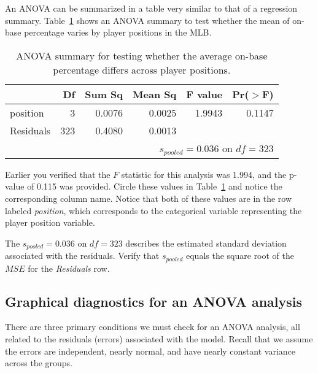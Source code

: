 An ANOVA can be summarized in a table very similar to that of a regression summary. Table~\ref{anovaSummaryTableForOBPAgainstPosition} shows an ANOVA summary to test whether the mean of on-base percentage varies by player positions in the MLB.

\begin{table}[ht]
\centering
\begin{tabular}{lrrrrr}
  \hline
 & Df & Sum Sq & Mean Sq & F value & Pr($>$F) \\ 
  \hline
position & 3 & 0.0076 & 0.0025 & 1.9943 & 0.1147 \\ 
  Residuals & 323 & 0.4080 & 0.0013 &  &  \\    \hline
\multicolumn{6}{r}{$s_{pooled} = 0.036$ on $df=323$}
\end{tabular}
\caption{ANOVA summary for testing whether the average on-base percentage differs across player positions.}
\label{anovaSummaryTableForOBPAgainstPosition}
\end{table}

\begin{exercise}
Earlier you verified that the $F$ statistic for this analysis was 1.994, and the p-value of 0.115 was provided. Circle these values in Table~\ref{anovaSummaryTableForOBPAgainstPosition} and notice the corresponding column name. Notice that both of these values are in the row labeled \emph{position}, which corresponds to the categorical variable representing the player position variable.
\end{exercise}

\begin{exercise}
The $s_{pooled}=0.036$ on $df=323$ describes the estimated standard deviation associated with the residuals. Verify that $s_{pooled}$ equals the square root of the $MSE$ for the \emph{Residuals} row.
\end{exercise}


\subsection{Graphical diagnostics for an ANOVA analysis}

There are three primary conditions we must check for an ANOVA analysis, all related to the residuals (errors) associated with the model. Recall that we assume the errors are independent, nearly normal, and have nearly constant variance across the groups.

